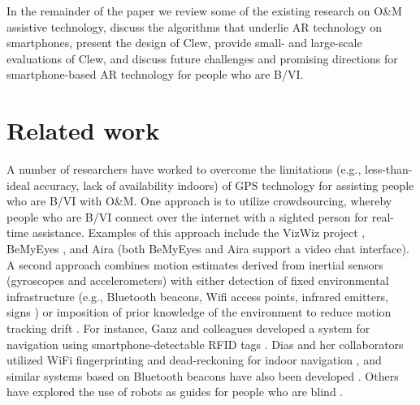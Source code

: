 \documentclass[chi_draft]{sigchi}
\newcommand{\BVI}{B/VI\xspace}
\newcommand{\OM}{O\&M\xspace}
\begin{document}
In the remainder of the paper we review some of the existing research on \OM assistive technology, discuss the algorithms that underlie AR technology on smartphones, present the design of Clew, provide small- and large-scale evaluations of Clew, and discuss future challenges and promising directions for smartphone-based AR technology for people who are \BVI.

\section{Related work}


A number of researchers have worked to overcome the limitations (e.g., less-than-ideal accuracy, lack of availability indoors) of GPS technology for assisting people who are \BVI with \OM.  One approach is to utilize crowdsourcing, whereby people who are \BVI connect over the internet with a sighted person for real-time assistance.  Examples of this approach include the VizWiz project \cite{bigham2010vizwiz}, BeMyEyes \cite{bemyeyesaccessworld}, and Aira \cite{aira} (both BeMyEyes and Aira support a video chat interface).  A second approach combines motion estimates derived from inertial sensors (gyroscopes and accelerometers) with either detection of fixed environmental infrastructure (e.g., Bluetooth beacons, Wifi access points, infrared emitters, signs \cite{legge2013indoor}) or imposition of prior knowledge of the environment to reduce motion tracking drift \cite{riehle2013indoor}.  For instance, Ganz and colleagues developed a system for navigation using smartphone-detectable RFID tags \cite{ganz2015percept, ganz2011percept, ganz2014percept}.  Dias and her collaborators utilized WiFi fingerprinting and dead-reckoning for indoor navigation \cite{Dias__2014_7778}, and similar systems based on Bluetooth beacons have also been developed \cite{ishihara2017beacon, ahmetovic2016navcog}.  Others have explored the use of robots as guides for people who are blind \cite{Nanavati:2018:CIN:3173386.3176976}.%
\end{document}

